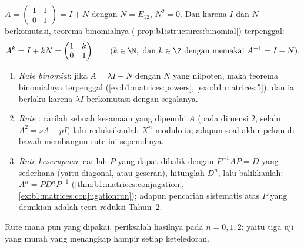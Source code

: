 \begin{example}\label{ex:b1:matrices:powers}
$A = \begin{pmatrix} 1 & 1 \\ 0 & 1\end{pmatrix} = I + N$ dengan $N =
E_{12}$, $N^2 = 0$. Dan karena $I$ dan $N$ berkomutasi, teorema binomialnya
(\cref{prop:b1:structures:binomial}) terpenggal:
\[
A^k = I + kN = \begin{pmatrix} 1 & k \\ 0 & 1 \end{pmatrix}
\qquad (k \in \N, \text{ dan } k \in \Z \text{ dengan memakai } A^{-1} = I -
N).
\]
\end{example}

\begin{method}
\label{met:b1:matrices:powers}
\begin{enumerate}
  \item \emph{Rute binomial}: jika $A = \lambda I + N$ dengan $N$ yang
        nilpoten, maka teorema binomialnya terpenggal
        (\cref{ex:b1:matrices:powers}, \cref{exo:b1:matrices:5});
        dan ia berlaku karena $\lambda I$ berkomutasi dengan segalanya.
  \item \emph{Rute }: carilah sebuah kesamaan 
        yang dipenuhi $A$ (pada dimensi $2$, selalu $A^2 = sA -
        pI$) lalu reduksikanlah $X^n$ modulo ia; adapun soal akhir pekan
        di bawah membangun rute ini sepenuhnya.
  \item \emph{Rute keserupaan}: carilah $P$ yang dapat dibalik dengan
        $P^{-1}AP = D$ yang sederhana (yaitu diagonal, atau geseran), hitunglah
        $D^n$, lalu balikkanlah: $A^n = P D^n P^{-1}$
        (\cref{thm:b1:matrices:conjugation},
        \cref{ex:b1:matrices:conjugationrun}); adapun pencarian sistematis
        atas $P$ yang demikian adalah teori reduksi Tahun~2.
\end{enumerate}
Rute mana pun yang dipakai, periksalah hasilnya pada $n = 0, 1, 2$: yaitu tiga
uji yang murah yang menangkap hampir setiap keteledoran.
\end{method}


